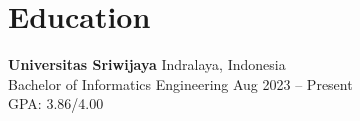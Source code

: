 \section*{Education}

\textbf{Universitas Sriwijaya} \hfill Indralaya, Indonesia\\
Bachelor of Informatics Engineering \hfill Aug 2023 -- Present\\
GPA: 3.86/4.00